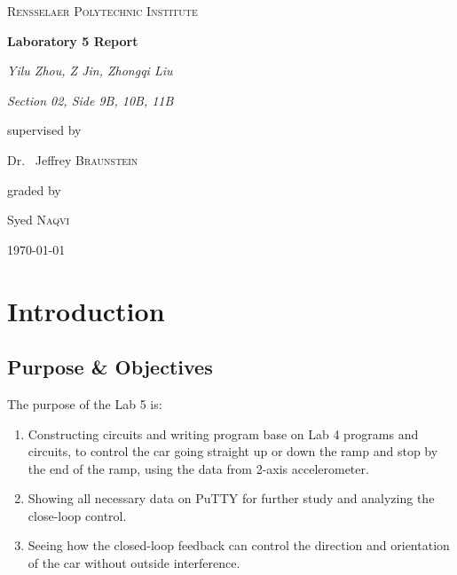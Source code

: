 \documentclass[12pt]{article}
\begin{document}
\begin{titlepage}
	\begin{center}
	{\scshape\LARGE{Rensselaer Polytechnic Institute}\par}
	\vspace{3.5cm}
	{\huge\bfseries{Laboratory 5 Report}\par}
	\vspace{2cm}
	{\Large\itshape{Yilu Zhou, Z Jin, Zhongqi Liu}\par}
    {\Large\itshape{Section 02, Side 9B, 10B, 11B}\par}
	\vfill
	supervised by\par
	Dr.~ Jeffrey \textsc{Braunstein}\par
    graded by\par
    Syed \textsc{Naqvi}
	\vfill
	{\large \today\par}
    \end{center}
\end{titlepage}
\section{Introduction}
\subsection{Purpose \& Objectives}
The purpose of the Lab 5 is:
\begin{enumerate}
\item Constructing circuits and writing program base on Lab 4 programs and circuits, to control the car going straight up or down the ramp and stop by the end of the ramp, using the data from 2-axis accelerometer.
\item Showing all necessary data on PuTTY for further study and analyzing the close-loop control.
\item Seeing how the closed-loop feedback can control the direction and orientation of the car without outside interference.
\end{enumerate}
\end{document}
